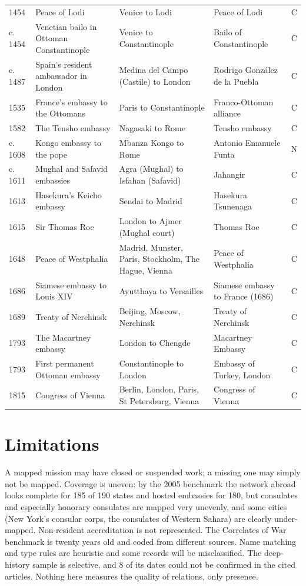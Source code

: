 \documentclass[11pt,a4paper]{article}
\begin{document}
{\begin{longtable}{p{1.6cm}p{4.5cm}p{3.7cm}p{3.6cm}c}
1454 & Peace of Lodi & Venice to Lodi & Peace of Lodi & C\\
c. 1454 & Venetian bailo in Ottoman Constantinople & Venice to Constantinople & Bailo of Constantinople & C\\
c. 1487 & Spain's resident ambassador in London & Medina del Campo (Castile) to London & Rodrigo González de la Puebla & C\\
1535 & France's embassy to the Ottomans & Paris to Constantinople & Franco-Ottoman alliance & C\\
1582 & The Tensho embassy & Nagasaki to Rome & Tensho embassy & C\\
c. 1608 & Kongo embassy to the pope & Mbanza Kongo to Rome & Antonio Emanuele Funta & N\\
c. 1611 & Mughal and Safavid embassies & Agra (Mughal) to Isfahan (Safavid) & Jahangir & C\\
1613 & Hasekura's Keicho embassy & Sendai to Madrid & Hasekura Tsunenaga & C\\
1615 & Sir Thomas Roe & London to Ajmer (Mughal court) & Thomas Roe & C\\
1648 & Peace of Westphalia & Madrid, Munster, Paris, Stockholm, The Hague, Vienna & Peace of Westphalia & C\\
1686 & Siamese embassy to Louis XIV & Ayutthaya to Versailles & Siamese embassy to France (1686) & C\\
1689 & Treaty of Nerchinsk & Beijing, Moscow, Nerchinsk & Treaty of Nerchinsk & C\\
1793 & The Macartney embassy & London to Chengde & Macartney Embassy & C\\
1793 & First permanent Ottoman embassy & Constantinople to London & Embassy of Turkey, London & C\\
1815 & Congress of Vienna & Berlin, London, Paris, St Petersburg, Vienna & Congress of Vienna & C\\
\bottomrule\end{longtable}}

\section{Limitations}
A mapped mission may have closed or suspended work; a missing one may simply not be mapped. Coverage is uneven: by the 2005 benchmark the network abroad looks complete for 185 of 190 states and hosted embassies for 180, but consulates and especially honorary consulates are mapped very unevenly, and some cities (New York's consular corps, the consulates of Western Sahara) are clearly under-mapped. Non-resident accreditation is not represented. The Correlates of War benchmark is twenty years old and coded from different sources. Name matching and type rules are heuristic and some records will be misclassified. The deep-history sample is selective, and 8 of its dates could not be confirmed in the cited articles. Nothing here measures the quality of relations, only presence.
\end{document}
